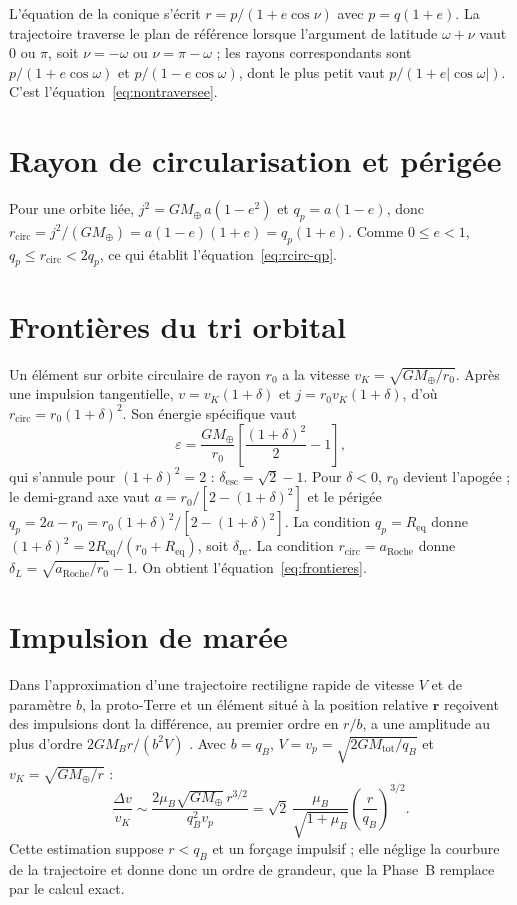 \documentclass[11pt,a4paper,openany]{report}
\newcommand{\Mt}{M_{\oplus}}
\newcommand{\Req}{R_{\mathrm{eq}}}
\newcommand{\aR}{a_{\mathrm{Roche}}}
\newcommand{\Mtot}{M_{\mathrm{tot}}}
\begin{document}
L'équation de la conique s'écrit $r=p/(1+e\cos\nu)$ avec $p=q(1+e)$. La trajectoire traverse le
plan de référence lorsque l'argument de latitude $\omega+\nu$ vaut $0$ ou $\pi$, soit $\nu=-\omega$ ou
$\nu=\pi-\omega$ ; les rayons correspondants sont $p/(1+e\cos\omega)$ et $p/(1-e\cos\omega)$, dont le
plus petit vaut $p/(1+e|\cos\omega|)$. C'est l'équation~\eqref{eq:nontraversee}.

\section{Rayon de circularisation et périgée}
\label{app:rcirc}

Pour une orbite liée, $j^2=G\Mt\,a(1-e^2)$ et $q_p=a(1-e)$, donc
$r_{\mathrm{circ}}=j^2/(G\Mt)=a(1-e)(1+e)=q_p(1+e)$. Comme $0\le e<1$,
$q_p\le r_{\mathrm{circ}}<2q_p$, ce qui établit l'équation~\eqref{eq:rcirc-qp}.

\section{Frontières du tri orbital}
\label{app:tri}

Un élément sur orbite circulaire de rayon $r_0$ a la vitesse $v_K=\sqrt{G\Mt/r_0}$. Après une
impulsion tangentielle, $v=v_K(1+\delta)$ et $j=r_0v_K(1+\delta)$, d'où
$r_{\mathrm{circ}}=r_0(1+\delta)^2$. Son énergie spécifique vaut
\begin{equation}
\varepsilon=\frac{G\Mt}{r_0}\left[\frac{(1+\delta)^2}{2}-1\right],
\end{equation}
qui s'annule pour $(1+\delta)^2=2$ : $\delta_{\mathrm{esc}}=\sqrt2-1$. Pour $\delta<0$, $r_0$ devient
l'apogée ; le demi-grand axe vaut $a=r_0/[2-(1+\delta)^2]$ et le périgée
$q_p=2a-r_0=r_0(1+\delta)^2/[2-(1+\delta)^2]$. La condition $q_p=\Req$ donne
$(1+\delta)^2=2\Req/(r_0+\Req)$, soit $\delta_{\mathrm{re}}$. La condition $r_{\mathrm{circ}}=\aR$
donne $\delta_L=\sqrt{\aR/r_0}-1$. On obtient l'équation~\eqref{eq:frontieres}.

\section{Impulsion de marée}
\label{app:impulsion}

Dans l'approximation d'une trajectoire rectiligne rapide de vitesse $V$ et de paramètre $b$, la
proto-Terre et un élément situé à la position relative $\mathbf{r}$ reçoivent des impulsions dont la
différence, au premier ordre en $r/b$, a une amplitude au plus d'ordre $2GM_Br/(b^2V)$
\cite{Spitzer1958,BinneyTremaine2008}. Avec $b=q_B$, $V=v_p=\sqrt{2G\Mtot/q_B}$ et
$v_K=\sqrt{G\Mt/r}$ :
\begin{equation}
\frac{\Delta v}{v_K}\sim\frac{2\mu_B\sqrt{G\Mt}\,r^{3/2}}{q_B^2v_p}
=\sqrt2\,\frac{\mu_B}{\sqrt{1+\mu_B}}\left(\frac{r}{q_B}\right)^{3/2}.
\end{equation}
Cette estimation suppose $r<q_B$ et un forçage impulsif ; elle néglige la courbure de la trajectoire
et donne donc un ordre de grandeur, que la Phase~B remplace par le calcul exact.
\end{document}
